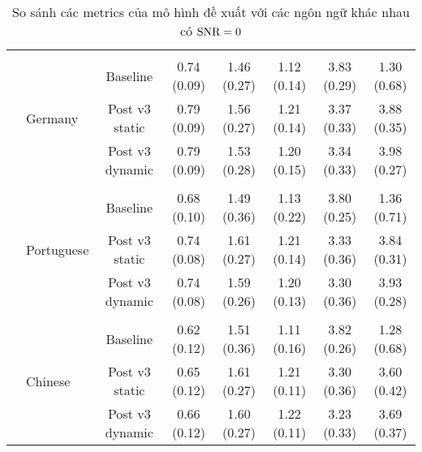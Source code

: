 \begin{sidewaystable}
\begin{subtable}{\textwidth}
\begin{tabular}{llcccccc}
					&&&&&&&\\
					& \multirow{3}{*}{Germany}      &Baseline       & 0.74 (0.09)   & 1.46 (0.27)   & 1.12 (0.14)   & 3.83 (0.29)   & 1.30 (0.68) \\
					&               &Post v3 static & 0.79 (0.09)   & 1.56 (0.27)   & 1.21 (0.14)   & 3.37 (0.33)   & 3.88 (0.35) \\
					&               &Post v3 dynamic        & 0.79 (0.09)   & 1.53 (0.28)   & 1.20 (0.15)   & 3.34 (0.33)   & 3.98 (0.27) \\
					&&&&&&&\\
					& \multirow{3}{*}{Portuguese}   &Baseline       & 0.68 (0.10)   & 1.49 (0.36)   & 1.13 (0.22)   & 3.80 (0.25)   & 1.36 (0.71) \\
					&               &Post v3 static & 0.74 (0.08)   & 1.61 (0.27)   & 1.21 (0.14)   & 3.33 (0.36)   & 3.84 (0.31) \\
					&               &Post v3 dynamic        & 0.74 (0.08)   & 1.59 (0.26)   & 1.20 (0.13)   & 3.30 (0.36)   & 3.93 (0.28) \\
					&&&&&&&\\
					& \multirow{3}{*}{Chinese}      &Baseline       & 0.62 (0.12)   & 1.51 (0.36)   & 1.11 (0.16)   & 3.82 (0.26)   & 1.28 (0.68) \\
					&               &Post v3 static & 0.65 (0.12)   & 1.61 (0.27)   & 1.21 (0.11)   & 3.30 (0.36)   & 3.60 (0.42) \\
					&               &Post v3 dynamic        & 0.66 (0.12)   & 1.60 (0.27)   & 1.22 (0.11)   & 3.23 (0.33)   & 3.69 (0.37) \\
					\hline
				\end{tabular}
				\caption{So sánh các metrics của mô hình đề xuất với các ngôn ngữ khác nhau có $\text{SNR}=0$}
			\end{subtable}
		\end{sidewaystable}
	
		\clearpage
		
